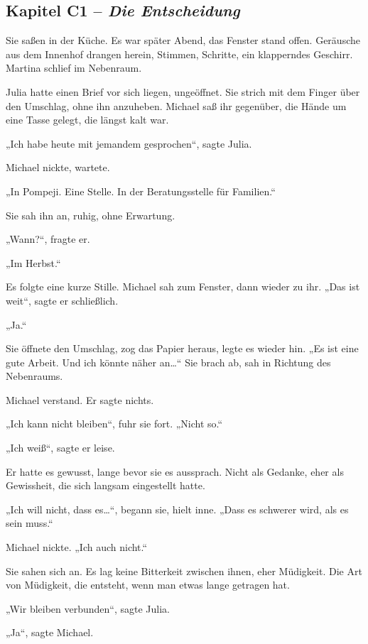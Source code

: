 \documentclass[
]{article}
\begin{document}
\subsection{\texorpdfstring{Kapitel C1 -- \emph{Die Entscheidung}}{Kapitel C1 -- Die Entscheidung}}\label{kapitel-c1-die-entscheidung}

Sie saßen in der Küche. Es war später Abend, das Fenster stand offen. Geräusche aus dem Innenhof drangen herein, Stimmen, Schritte, ein klapperndes Geschirr. Martina schlief im Nebenraum.

Julia hatte einen Brief vor sich liegen, ungeöffnet. Sie strich mit dem Finger über den Umschlag, ohne ihn anzuheben. Michael saß ihr gegenüber, die Hände um eine Tasse gelegt, die längst kalt war.

„Ich habe heute mit jemandem gesprochen``, sagte Julia.

Michael nickte, wartete.

„In Pompeji. Eine Stelle. In der Beratungsstelle für Familien.``

Sie sah ihn an, ruhig, ohne Erwartung.

„Wann?{\kern0pt}``, fragte er.

„Im Herbst.``

Es folgte eine kurze Stille. Michael sah zum Fenster, dann wieder zu ihr. „Das ist weit``, sagte er schließlich.

„Ja.``

Sie öffnete den Umschlag, zog das Papier heraus, legte es wieder hin. „Es ist eine gute Arbeit. Und ich könnte näher an\ldots`` Sie brach ab, sah in Richtung des Nebenraums.

Michael verstand. Er sagte nichts.

„Ich kann nicht bleiben``, fuhr sie fort. „Nicht so.``

„Ich weiß``, sagte er leise.

Er hatte es gewusst, lange bevor sie es aussprach. Nicht als Gedanke, eher als Gewissheit, die sich langsam eingestellt hatte.

„Ich will nicht, dass es\ldots``, begann sie, hielt inne. „Dass es schwerer wird, als es sein muss.``

Michael nickte. „Ich auch nicht.``

Sie sahen sich an. Es lag keine Bitterkeit zwischen ihnen, eher Müdigkeit. Die Art von Müdigkeit, die entsteht, wenn man etwas lange getragen hat.

„Wir bleiben verbunden``, sagte Julia.

„Ja``, sagte Michael.
\end{document}
